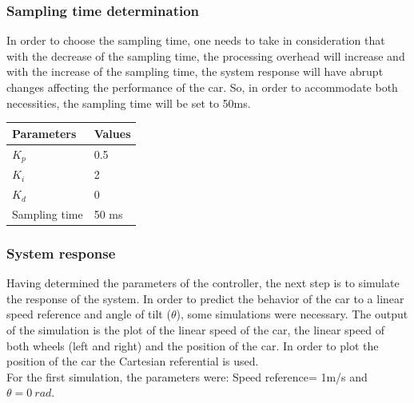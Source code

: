\subsubsection{Sampling time determination}
In order to choose the sampling time, one needs to take in consideration that with the decrease of the sampling time, the processing overhead will increase and with the increase of the sampling time, the system response will have abrupt changes affecting the performance of the car. So, in order to accommodate both necessities, the sampling time will be set to 50ms.
\begin{table}[]
\begin{tabular}{|l|l|}
\hline
\rowcolor[HTML]{FFFFFF} 
Parameters    & Values \\ \hline
$K_p$         & 0.5    \\ \hline
\rowcolor[HTML]{FFFFFF} 
$K_i$         & 2      \\ \hline
\rowcolor[HTML]{FFFFFF} 
$K_d$         & 0      \\ \hline
\rowcolor[HTML]{FFFFFF} 
Sampling time & 50 ms  \\ \hline
\end{tabular}
\end{table}
\subsubsection{System response}
\label{sec:des-sim-res}
Having determined the parameters of the controller, the next step is to simulate the response of the system.
In order to predict the behavior of the car to a linear speed reference and angle of tilt ($\theta$), some simulations were necessary. The output of the simulation is the plot of the linear speed of the car, the linear speed of both wheels (left and right) and the position of the car.
In order to plot the position of the car the Cartesian referential is used.\\
For the first simulation, the parameters were: Speed reference= 1m/s and $\theta = 0~\si{rad}$.\\


